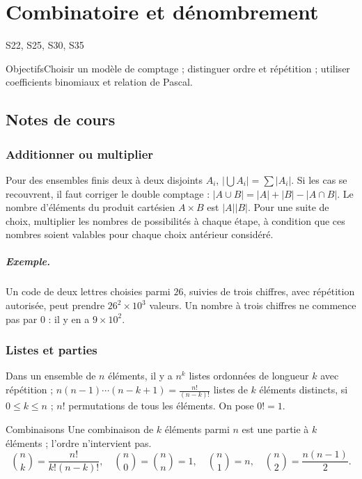 \setcounter{chapter}{8}\chapter{Combinatoire et dénombrement}\label{ch:9}

{\small\sffamily\color{teal}S22, S25, S30, S35\par}

\begin{retenir}{Objectifs}Choisir un modèle de comptage ; distinguer ordre et répétition ; utiliser coefficients binomiaux et relation de Pascal.\end{retenir}

\section{Notes de cours}
\subsection{Additionner ou multiplier}
Pour des ensembles finis deux à deux disjoints $A_i$, $|\bigcup A_i|=\sum|A_i|$. Si les cas se recouvrent, il faut corriger le double comptage : $|A\cup B|=|A|+|B|-|A\cap B|$.
Le nombre d'éléments du produit cartésien $A\times B$ est $|A||B|$. Pour une suite de choix, multiplier les nombres de possibilités à chaque étape, à condition que ces nombres soient valables pour chaque choix antérieur considéré.
\paragraph{Exemple.} Un code de deux lettres choisies parmi $26$, suivies de trois chiffres, avec répétition autorisée, peut prendre $26^2\times10^3$ valeurs. Un nombre à trois chiffres ne commence pas par $0$ : il y en a $9\times10^2$.
\subsection{Listes et parties}
Dans un ensemble de $n$ éléments, il y a $n^k$ listes ordonnées de longueur $k$ avec répétition ; $n(n-1)\cdots(n-k+1)=\frac{n!}{(n-k)!}$ listes de $k$ éléments distincts, si $0\le k\le n$ ; $n!$ permutations de tous les éléments. On pose $0!=1$.
\begin{retenir}{Combinaisons}
Une combinaison de $k$ éléments parmi $n$ est une partie à $k$ éléments ; l'ordre n'intervient pas.
\[\binom nk=\frac{n!}{k!(n-k)!},\quad\binom n0=\binom nn=1,\quad\binom n1=n,\quad\binom n2=\frac{n(n-1)}2.\]
\end{retenir}
